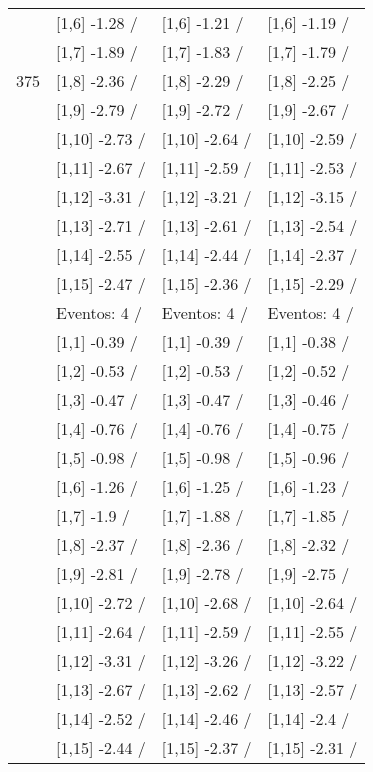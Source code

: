 \begin{table}
\begin{tabular}[t]{llll}
 & {}[1,6] -1.28  / & {}[1,6] -1.21  / & {}[1,6] -1.19  /\\
 & {}[1,7] -1.89  / & {}[1,7] -1.83  / & {}[1,7] -1.79  /\\
375 & {}[1,8] -2.36  / & {}[1,8] -2.29  / & {}[1,8] -2.25  /\\
\addlinespace
 & {}[1,9] -2.79  / & {}[1,9] -2.72  / & {}[1,9] -2.67  /\\
 & {}[1,10] -2.73  / & {}[1,10] -2.64  / & {}[1,10] -2.59  /\\
 & {}[1,11] -2.67  / & {}[1,11] -2.59  / & {}[1,11] -2.53  /\\
 & {}[1,12] -3.31  / & {}[1,12] -3.21  / & {}[1,12] -3.15  /\\
 & {}[1,13] -2.71  / & {}[1,13] -2.61  / & {}[1,13] -2.54  /\\
\addlinespace
 & {}[1,14] -2.55  / & {}[1,14] -2.44  / & {}[1,14] -2.37  /\\
 & {}[1,15] -2.47  / & {}[1,15] -2.36  / & {}[1,15] -2.29  /\\
 & Eventos:  4 / & Eventos:  4 / & Eventos:  4 /\\
 & {}[1,1] -0.39  / & {}[1,1] -0.39  / & {}[1,1] -0.38  /\\
 & {}[1,2] -0.53  / & {}[1,2] -0.53  / & {}[1,2] -0.52  /\\
\addlinespace
 & {}[1,3] -0.47  / & {}[1,3] -0.47  / & {}[1,3] -0.46  /\\
 & {}[1,4] -0.76  / & {}[1,4] -0.76  / & {}[1,4] -0.75  /\\
 & {}[1,5] -0.98  / & {}[1,5] -0.98  / & {}[1,5] -0.96  /\\
 & {}[1,6] -1.26  / & {}[1,6] -1.25  / & {}[1,6] -1.23  /\\
 & {}[1,7] -1.9  / & {}[1,7] -1.88  / & {}[1,7] -1.85  /\\
\addlinespace
500 & {}[1,8] -2.37  / & {}[1,8] -2.36  / & {}[1,8] -2.32  /\\
 & {}[1,9] -2.81  / & {}[1,9] -2.78  / & {}[1,9] -2.75  /\\
 & {}[1,10] -2.72  / & {}[1,10] -2.68  / & {}[1,10] -2.64  /\\
 & {}[1,11] -2.64  / & {}[1,11] -2.59  / & {}[1,11] -2.55  /\\
 & {}[1,12] -3.31  / & {}[1,12] -3.26  / & {}[1,12] -3.22  /\\
\addlinespace
 & {}[1,13] -2.67  / & {}[1,13] -2.62  / & {}[1,13] -2.57  /\\
 & {}[1,14] -2.52  / & {}[1,14] -2.46  / & {}[1,14] -2.4  /\\
 & {}[1,15] -2.44  / & {}[1,15] -2.37  / & {}[1,15] -2.31  /\\
\bottomrule
\end{tabular}
\end{table}
